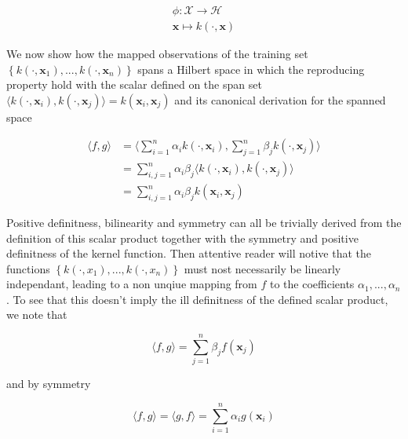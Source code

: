 \begin{equation}
  \begin{aligned}
    \phi : \mathcal{X} \rightarrow \mathcal{H}\\
    \mathbf{x} \mapsto k(\cdot, \mathbf{x})
  \end{aligned}
\end{equation}

We now show how the mapped observations of the training set $\left\{k\left(\cdot, \mathbf{x}_1\right), ..., k\left(\cdot, \mathbf{x}_n\right)\right\}$ spans a Hilbert space in which the reproducing property hold with the scalar defined on the span set $\langle k\left(\cdot, \mathbf{x}_i\right), k\left(\cdot, \mathbf{x}_j\right)\rangle = k\left(\mathbf{x}_i, \mathbf{x}_j\right)$ and its canonical derivation for the spanned space

\begin{equation*}
  \begin{aligned}
    \langle f, g\rangle 
    &= \langle \sum_{i=1}^n\alpha_ik(\cdot, \mathbf{x}_i), \sum_{j=1}^n\beta_jk(\cdot, \mathbf{x}_j)\rangle \\
    &= \sum_{i,j=1}^n\alpha_i\beta_j \langle k\left(\cdot, \mathbf{x}_i\right), k\left(\cdot, \mathbf{x}_j\right)\rangle \\
    &= \sum_{i,j=1}^n\alpha_i\beta_j k\left(\mathbf{x}_i, \mathbf{x}_j\right)
  \end{aligned}
\end{equation*}

Positive definitness, bilinearity and symmetry can all be trivially derived from the definition of this scalar product together with the symmetry and positive definitness of the kernel function. Then attentive reader will notive that the functions $\left\{k\left(\cdot, x_1\right), ..., k\left(\cdot, x_n\right)\right\}$ must nost necessarily be linearly independant, leading to a non unqiue mapping from $f$ to the coefficients $\alpha_1, ..., \alpha_n$. To see that this doesn't imply the ill definitness of the defined scalar product, we note that

\begin{equation*}
  \langle f, g\rangle = \sum_{j=1}^n\beta_j f\left(\mathbf{x}_j\right)
\end{equation*}

and by symmetry

\begin{equation*}
  \langle f, g\rangle = \langle g, f\rangle = \sum_{i=1}^n\alpha_i g\left(\mathbf{x}_i\right)
\end{equation*}

